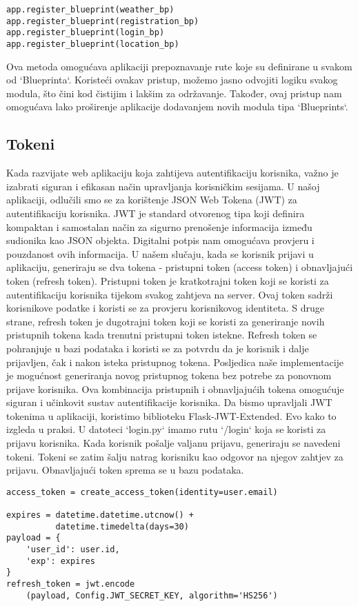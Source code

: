 \documentclass[times, utf8, zavrsni]{fer}
\begin{document}
\begin{verbatim}
app.register_blueprint(weather_bp)
app.register_blueprint(registration_bp)
app.register_blueprint(login_bp)
app.register_blueprint(location_bp)
\end{verbatim}
Ova metoda omogućava aplikaciji prepoznavanje rute koje su definirane u svakom od `Blueprinta`. Koristeći ovakav pristup, možemo jasno odvojiti logiku svakog modula, što čini kod čistijim i lakšim za održavanje. Također, ovaj pristup nam omogućava lako proširenje aplikacije dodavanjem novih modula tipa `Blueprints`.
\newpage
\subsection{Tokeni}
Kada razvijate web aplikaciju koja zahtijeva autentifikaciju korisnika, važno je izabrati siguran i efikasan način upravljanja korisničkim sesijama. U našoj aplikaciji, odlučili smo se za korištenje JSON Web Tokena (JWT) za autentifikaciju korisnika. JWT je standard otvorenog tipa koji definira kompaktan i samostalan način za sigurno prenošenje informacija između sudionika kao JSON objekta. Digitalni potpis nam omogućava provjeru i pouzdanost ovih informacija. U našem slučaju, kada se korisnik prijavi u aplikaciju, generiraju se dva tokena - pristupni token (access token) i obnavljajući token (refresh token). Pristupni token je kratkotrajni token koji se koristi za autentifikaciju korisnika tijekom svakog zahtjeva na server. Ovaj token sadrži korisnikove podatke i koristi se za provjeru korisnikovog identiteta. S druge strane, refresh token je dugotrajni token koji se koristi za generiranje novih pristupnih tokena kada trenutni pristupni token istekne. Refresh token se pohranjuje u bazi podataka i koristi se za potvrdu da je korisnik i dalje prijavljen, čak i nakon isteka pristupnog tokena. Posljedica naše implementacije je mogućnost generiranja novog pristupnog tokena bez potrebe za ponovnom prijave korisnika. Ova kombinacija pristupnih i obnavljajućih tokena omogućuje siguran i učinkovit sustav autentifikacije korisnika. Da bismo upravljali JWT tokenima u aplikaciji, koristimo biblioteku Flask-JWT-Extended. Evo kako to izgleda u praksi. U datoteci `login.py` imamo rutu `/login` koja se koristi za prijavu korisnika. Kada korisnik pošalje valjanu prijavu, generiraju se navedeni tokeni. Tokeni se zatim šalju natrag korisniku kao odgovor na njegov zahtjev za prijavu. Obnavljajući token sprema se u bazu podataka.
\begin{verbatim}
access_token = create_access_token(identity=user.email)

expires = datetime.datetime.utcnow() + 
          datetime.timedelta(days=30)
payload = {
    'user_id': user.id,
    'exp': expires
}
refresh_token = jwt.encode
    (payload, Config.JWT_SECRET_KEY, algorithm='HS256')
\end{verbatim}
\end{document}
